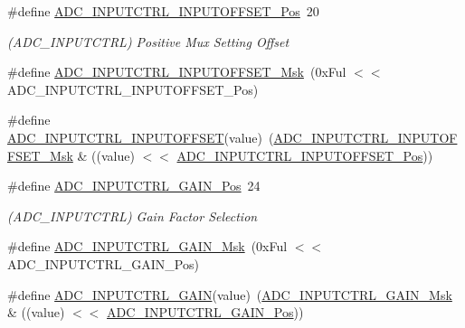 \begin{DoxyCompactItemize}
\item 
\#define \mbox{\hyperlink{group___s_a_m_d21___a_d_c_ga8e2e49a897b3028361dfa91c95aa80b2}{A\+D\+C\+\_\+\+I\+N\+P\+U\+T\+C\+T\+R\+L\+\_\+\+I\+N\+P\+U\+T\+O\+F\+F\+S\+E\+T\+\_\+\+Pos}}~20
\begin{DoxyCompactList}\small\item\em (A\+D\+C\+\_\+\+I\+N\+P\+U\+T\+C\+T\+RL) Positive Mux Setting Offset \end{DoxyCompactList}\item 
\#define \mbox{\hyperlink{group___s_a_m_d21___a_d_c_ga83fcf78f3ebb042cade93996ae4792bd}{A\+D\+C\+\_\+\+I\+N\+P\+U\+T\+C\+T\+R\+L\+\_\+\+I\+N\+P\+U\+T\+O\+F\+F\+S\+E\+T\+\_\+\+Msk}}~(0x\+Ful $<$$<$ A\+D\+C\+\_\+\+I\+N\+P\+U\+T\+C\+T\+R\+L\+\_\+\+I\+N\+P\+U\+T\+O\+F\+F\+S\+E\+T\+\_\+\+Pos)
\item 
\#define \mbox{\hyperlink{group___s_a_m_d21___a_d_c_ga950659039fca4b082661ea501821ea62}{A\+D\+C\+\_\+\+I\+N\+P\+U\+T\+C\+T\+R\+L\+\_\+\+I\+N\+P\+U\+T\+O\+F\+F\+S\+ET}}(value)~(\mbox{\hyperlink{group___s_a_m_d21___a_d_c_ga83fcf78f3ebb042cade93996ae4792bd}{A\+D\+C\+\_\+\+I\+N\+P\+U\+T\+C\+T\+R\+L\+\_\+\+I\+N\+P\+U\+T\+O\+F\+F\+S\+E\+T\+\_\+\+Msk}} \& ((value) $<$$<$ \mbox{\hyperlink{group___s_a_m_d21___a_d_c_ga8e2e49a897b3028361dfa91c95aa80b2}{A\+D\+C\+\_\+\+I\+N\+P\+U\+T\+C\+T\+R\+L\+\_\+\+I\+N\+P\+U\+T\+O\+F\+F\+S\+E\+T\+\_\+\+Pos}}))
\item 
\#define \mbox{\hyperlink{group___s_a_m_d21___a_d_c_ga763ede70c37622db7cef7ce43bcabb0a}{A\+D\+C\+\_\+\+I\+N\+P\+U\+T\+C\+T\+R\+L\+\_\+\+G\+A\+I\+N\+\_\+\+Pos}}~24
\begin{DoxyCompactList}\small\item\em (A\+D\+C\+\_\+\+I\+N\+P\+U\+T\+C\+T\+RL) Gain Factor Selection \end{DoxyCompactList}\item 
\#define \mbox{\hyperlink{group___s_a_m_d21___a_d_c_ga78253a51963a7b846a076fc50615ba8d}{A\+D\+C\+\_\+\+I\+N\+P\+U\+T\+C\+T\+R\+L\+\_\+\+G\+A\+I\+N\+\_\+\+Msk}}~(0x\+Ful $<$$<$ A\+D\+C\+\_\+\+I\+N\+P\+U\+T\+C\+T\+R\+L\+\_\+\+G\+A\+I\+N\+\_\+\+Pos)
\item 
\#define \mbox{\hyperlink{group___s_a_m_d21___a_d_c_gae981270bf0c884500d8f337ca6f485d3}{A\+D\+C\+\_\+\+I\+N\+P\+U\+T\+C\+T\+R\+L\+\_\+\+G\+A\+IN}}(value)~(\mbox{\hyperlink{group___s_a_m_d21___a_d_c_ga78253a51963a7b846a076fc50615ba8d}{A\+D\+C\+\_\+\+I\+N\+P\+U\+T\+C\+T\+R\+L\+\_\+\+G\+A\+I\+N\+\_\+\+Msk}} \& ((value) $<$$<$ \mbox{\hyperlink{group___s_a_m_d21___a_d_c_ga763ede70c37622db7cef7ce43bcabb0a}{A\+D\+C\+\_\+\+I\+N\+P\+U\+T\+C\+T\+R\+L\+\_\+\+G\+A\+I\+N\+\_\+\+Pos}}))

\end{DoxyCompactItemize}
